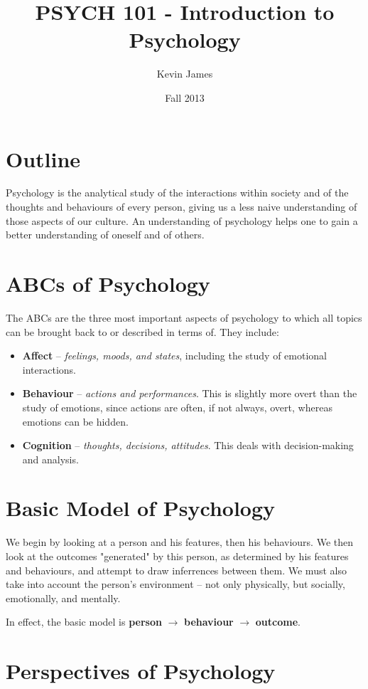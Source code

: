 \documentclass[12pt]{article}
\begin{document}
\title{PSYCH 101 - Introduction to Psychology}
\author{Kevin James}
\date{\vspace{-2ex}Fall 2013}
\maketitle\HRule

\section*{Outline}
Psychology is the analytical study of the interactions within society and of the thoughts and behaviours of every person, giving us a less naive understanding of those aspects of our culture. An understanding of psychology helps one to gain a better understanding of oneself and of others.

\section*{ABCs of Psychology}
The ABCs are the three most important aspects of psychology to which all topics can be brought back to or described in terms of. They include:
\begin{itemize}
\item {\bf Affect} -- {\it feelings, moods, and states}, including the study of emotional interactions.
\item {\bf Behaviour} -- {\it actions and performances}. This is slightly more overt than the study of emotions, since actions are often, if not always, overt, whereas emotions can be hidden.
\item {\bf Cognition} -- {\it thoughts, decisions, attitudes}. This deals with decision-making and analysis.
\end{itemize}

\section*{Basic Model of Psychology}
We begin by looking at a person and his features, then his behaviours. We then look at the outcomes "generated" by this person, as determined by his features and behaviours, and attempt to draw inferrences between them. We must also take into account the person's environment -- not only physically, but socially, emotionally, and mentally.

In effect, the basic model is {\bf person} $\rightarrow$ {\bf behaviour} $\rightarrow$ {\bf outcome}. 

\section*{Perspectives of Psychology}
\end{document}
